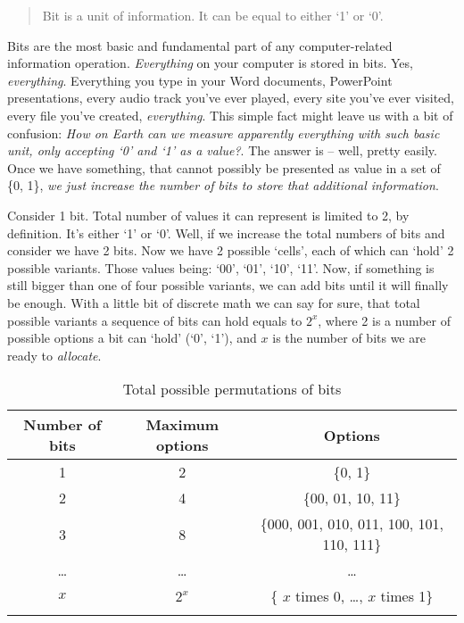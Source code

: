 \documentclass[../../what-is-computer.tex]{subfiles}
\begin{document}
    \begin{quote}
        Bit is a unit of information. It can be equal to either `1' or `0'.
    \end{quote}

    Bits are the most basic and fundamental part of any computer-related information operation. \emph{Everything} on your computer is stored in bits. Yes, 
    \emph{everything}. Everything you type in your Word documents, PowerPoint presentations, every audio track you've ever played, every site you've ever 
    visited, every file you've created, \emph{everything}. This simple fact might leave us with a bit of confusion: \emph{How on Earth can we measure apparently
    everything with such basic unit, only accepting `0' and `1' as a value?}. The answer is -- well, pretty easily. Once we have something, that cannot possibly
    be presented as value in a set of \{0, 1\}, \emph{we just increase the number of bits to store that additional information}. \par

    Consider 1 bit. Total number of values it can represent is limited to 2, by definition. It's either `1' or `0'. Well, if we increase the total numbers
    of bits and consider we have 2 bits. Now we have 2 possible `cells', each of which can `hold' 2 possible variants. Those values being: `00', `01', `10', `11'.
    Now, if something is still bigger than one of four possible variants, we can add bits until it will finally be enough. With a little bit of discrete math
    we can say for sure, that total possible variants a sequence of bits can hold equals to $2^x$, where 2 is a number of possible options a bit can `hold' (`0', `1'), 
    and $x$ is the number of bits we are ready to \emph{allocate}.

    \begin{table}[h]
        \centering
        \begin{longtable}{|c|c|c|}
            \hline
            Number of bits & Maximum options & Options \\\hline
            1 & 2 & \{0, 1\} \\\hline
            2 & 4 & \{00, 01, 10, 11\} \\\hline
            3 & 8 & \{000, 001, 010, 011, 100, 101, 110, 111\} \\\hline
            \ldots & \ldots & \ldots \\\hline
            $x$ & $2^x$ & \{ $x$ times 0, \ldots, $x$ times 1\} \\\hline
            \caption{Total possible permutations of bits}

        \end{longtable}
    \end{table}
\end{document}
